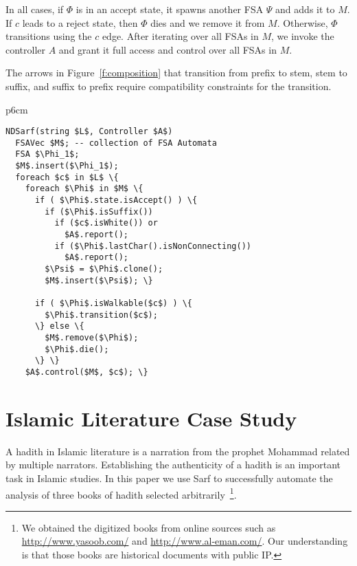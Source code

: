 \documentclass[11pt,letterpaper]{article}
\begin{document}
In all cases, if $\Phi$ is in an accept state, 
it spawns another FSA $\Psi$ and adds it to $M$. 
If $c$ leads to a reject state, then $\Phi$ dies 
and we remove it from $M$. 
Otherwise, $\Phi$ transitions using the $c$ edge.
After iterating over all FSAs in $M$, we invoke the 
controller $A$
and grant it full access and control over
all FSAs in $M$. 

The arrows in Figure~\ref{f:composition} that transition
from prefix to stem, stem to suffix, and suffix to prefix
require compatibility constraints for 
the transition.

\begin{table}[tb]
\centering
\begin{tabular} {p{6cm}}
\begin{Verbatim}[fontsize=\relsize{-1},
frame=topline,framesep=4mm,label=\fbox{NDSarf algorithm},
commandchars=\\\{\}, codes={\catcode`$=3\catcode`_=8}]
NDSarf(string $L$, Controller $A$) 
  FSAVec $M$; -- collection of FSA Automata
  FSA $\Phi_1$;
  $M$.insert($\Phi_1$);
  foreach $c$ in $L$ \{
    foreach $\Phi$ in $M$ \{
      if ( $\Phi$.state.isAccept() ) \{
        if ($\Phi$.isSuffix())
          if ($c$.isWhite()) or 
            $A$.report();
          if ($\Phi$.lastChar().isNonConnecting())
            $A$.report();
        $\Psi$ = $\Phi$.clone();
        $M$.insert($\Psi$); \}

      if ( $\Phi$.isWalkable($c$) ) \{
        $\Phi$.transition($c$);
      \} else \{
        $M$.remove($\Phi$);
        $\Phi$.die();
      \} \} 
    $A$.control($M$, $c$); \}
\end{Verbatim}
\end{tabular}
\label{a:ndsarf}
\end{table}

\section{Islamic Literature Case Study}
\label{sec:islamic}

A hadith in Islamic literature is a narration from the prophet Mohammad
related by multiple narrators.
Establishing the authenticity of a hadith is an important task
in Islamic studies. 
In this paper we use Sarf to successfully automate the
analysis of three books of hadith selected 
arbitrarily~\cite{IbnHanbal,AlKulayni,AlTousi}\footnote{We obtained
  the digitized books from online sources such as 
  \href{http://www.yasoob.com/}{http://www.yasoob.com/} and 
  \href{http://www.al-eman.com/}{http://www.al-eman.com/}. 
  Our understanding is that those books are historical documents with 
  public IP.}.
\end{document}
